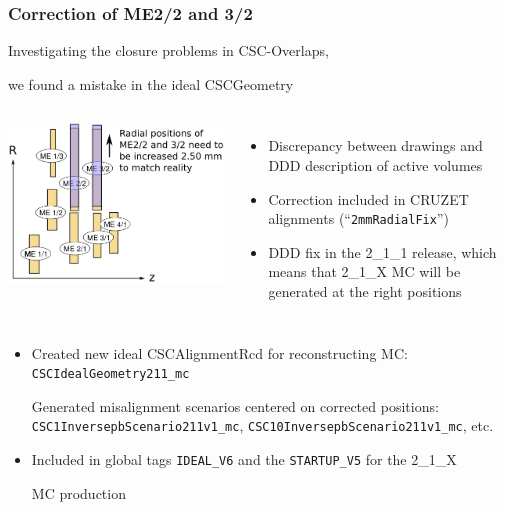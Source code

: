 \documentclass[compress]{beamer}
\begin{document}
\begin{frame}
\frametitle{Correction of ME2/2 and 3/2}
\small

Investigating the closure problems in CSC-Overlaps,

we found a mistake in the ideal CSCGeometry

\vfill
\begin{columns}
\includegraphics[width=\linewidth]{expand_ME22_32.png}

\begin{itemize}
\item Discrepancy between drawings and DDD description of active volumes
\item Correction included in CRUZET alignments (``{\tt \scriptsize 2mmRadialFix}'')
\item DDD fix in the 2\_1\_1 release, which means that 2\_1\_X MC will be generated at the right positions
\end{itemize}
\end{columns}

\vspace{0.1 cm}
\begin{itemize}
\item Created new ideal CSCAlignmentRcd for reconstructing MC: {\tt \scriptsize CSCIdealGeometry211\_mc}

\vspace{0.1 cm}
Generated misalignment scenarios centered on corrected positions: {\tt \scriptsize CSC1InversepbScenario211v1\_mc}, {\tt \scriptsize CSC10InversepbScenario211v1\_mc}, etc.

\item Included in global tags {\tt \scriptsize IDEAL\_V6} and the {\tt \scriptsize STARTUP\_V5} for the 2\_1\_X

MC production
\end{itemize}
\end{frame}
\end{document}
